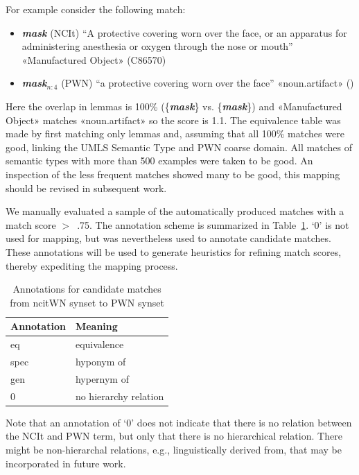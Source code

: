 \documentclass[11pt]{article}
\newcommand{\lex}[1]{\textbf{\textit{#1}}}
\begin{document}
For example consider the following match:
\begin{itemize}
\item \lex{mask} (NCIt) ``A protective covering worn over the face, or an apparatus for administering anesthesia or oxygen through the nose or mouth'' «Manufactured Object» (C86570)
\item \lex{mask}$_{n:4}$ (PWN) ``a protective covering worn over the face'' «noun.artifact» ()
\end{itemize}
Here the overlap in lemmas is 100\% (\{\lex{mask}\} vs. \{\lex{mask}\}) and «Manufactured Object» matches «noun.artifact» so the score is 1.1.  The equivalence table was made by first matching %
only lemmas and, assuming that all 100\% matches were good, linking the UMLS Semantic Type and PWN coarse domain. All matches of semantic types with more than 500 examples were taken to be good.   An inspection of the less frequent matches showed many to be good, this mapping should be revised in subsequent work.

We manually evaluated a sample of the automatically produced matches with a match score $>$~.75. The annotation scheme is summarized in Table~\ref{tab:annotation}.
`0' is not used for mapping, but was nevertheless used to annotate candidate matches. These annotations will be used to generate heuristics for refining match scores, thereby expediting the mapping process.

\begin{table}[h]
\begin{center}
\begin{tabular}{|l|l|}
\hline \bf Annotation & \bf Meaning \\
\hline eq &  equivalence \\
spec &  hyponym of  \\
gen &    hypernym of\\
0 & no hierarchy relation \\
\hline
\end{tabular}
\caption{Annotations for candidate matches from ncitWN synset to PWN synset}\label{tab:annotation}
\end{center}
\end{table}

Note that an annotation of `0' does not indicate that there is no relation between the NCIt and PWN term, but only that there is no hierarchical relation. There might be non-hierarchal relations, e.g., linguistically derived from, that may be incorporated in future work.
\end{document}
